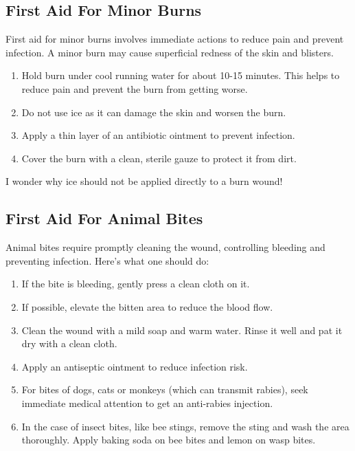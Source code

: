\subsection{First Aid For Minor Burns}
First aid for minor burns involves immediate actions to reduce pain and prevent infection. A minor burn may cause superficial redness of the skin and blisters.
\begin{enumerate}
    \item Hold burn under cool running water for about 10-15 minutes. This helps to reduce pain and prevent the burn from getting worse.
    \item Do not use ice as it can damage the skin and worsen the burn.
    \item Apply a thin layer of an antibiotic ointment to prevent infection.
    \item Cover the burn with a clean, sterile gauze to protect it from dirt.
\end{enumerate}
\vspace{0.1in}
\par
I wonder why ice should not be applied directly to a burn wound!
\vspace{0.4in}
\subsection{First Aid For Animal Bites}
Animal bites require promptly cleaning the wound, controlling bleeding and preventing infection. Here's what one should do:
\begin{enumerate}
    \item If the bite is bleeding, gently press a clean cloth on it.
    \item If possible, elevate the bitten area to reduce the blood flow.
    \item Clean the wound with a mild soap and warm water. Rinse it well and pat it dry with a clean cloth.
    \item Apply an antiseptic ointment to reduce infection risk.
    \item For bites of dogs, cats or monkeys (which can transmit rabies), seek immediate medical attention to get an anti-rabies injection.
    \item In the case of insect bites, like bee stings, remove the sting and wash the area thoroughly. Apply baking soda on bee bites and lemon on wasp bites.
\end{enumerate}
\vspace{1.1in}
